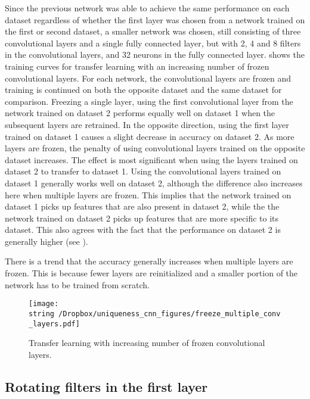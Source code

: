 Since the previous network was able to achieve the same performance on each dataset regardless of whether the first layer was chosen from a network trained on the first or second dataset, a smaller network was chosen, still consisting of three convolutional layers and a single fully connected layer, but with 2, 4 and 8 filters in the convolutional layers, and 32 neurons in the fully connected layer.
 shows the training curves for transfer learning with an increasing number of frozen convolutional layers. For each network, the convolutional layers are frozen and training is continued on both the opposite dataset and the same dataset for comparison.
Freezing a single layer, using the first convolutional layer from the network trained on dataset 2 performs equally well on dataset 1 when the subsequent layers are retrained.
In the opposite direction, using the first layer trained on dataset 1 causes a slight decrease in accuracy on dataset 2.
As more layers are frozen, the penalty of using convolutional layers trained on the opposite dataset increases.
The effect is most significant when using the layers trained on dataset 2 to transfer to dataset 1.
Using the convolutional layers trained on dataset 1 generally works well on dataset 2, although the difference also increases here when multiple layers are frozen.
This implies that the network trained on dataset 1 picks up features that are also present in dataset 2, while the the network trained on dataset 2 picks up features that are more specific to its dataset. This also agrees with the fact that the performance on dataset 2 is generally higher (see ).

There is a trend that the accuracy generally increases when multiple layers are frozen.
This is because fewer layers are reinitialized and a smaller portion of the network has to be trained from scratch.




\begin{figure}
  \begin{center}
    \texttt{[image: \\string~/Dropbox/uniqueness\_cnn\_figures/freeze\_multiple\_conv\_layers.pdf]}
  \end{center}
  \caption{Transfer learning with increasing number of frozen convolutional layers.}
  \label{fig:freeze_multiple_conv_layers}
\end{figure}



\subsection{Rotating filters in the first layer}


